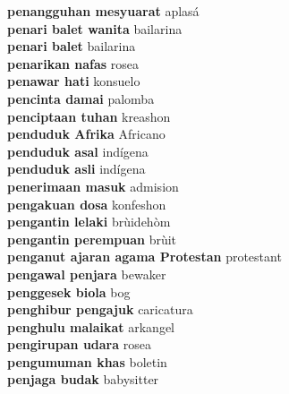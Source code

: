 \textbf{ penangguhan mesyuarat  } aplasá \\
\textbf{ penari balet wanita  } bailarina \\
\textbf{ penari balet  } bailarina \\
\textbf{ penarikan nafas  } rosea \\
\textbf{ penawar hati  } konsuelo \\
\textbf{ pencinta damai  } palomba \\
\textbf{ penciptaan tuhan  } kreashon \\
\textbf{ penduduk Afrika  } Africano \\
\textbf{ penduduk asal  } indígena \\
\textbf{ penduduk asli  } indígena \\
\textbf{ penerimaan masuk  } admision \\
\textbf{ pengakuan dosa  } konfeshon \\
\textbf{ pengantin lelaki  } brùidehòm \\
\textbf{ pengantin perempuan  } brùit \\
\textbf{ penganut ajaran agama Protestan  } protestant \\
\textbf{ pengawal penjara  } bewaker \\
\textbf{ penggesek biola  } bog \\
\textbf{ penghibur pengajuk  } caricatura \\
\textbf{ penghulu malaikat  } arkangel \\
\textbf{ pengirupan udara  } rosea \\
\textbf{ pengumuman khas  } boletin \\
\textbf{ penjaga budak  } babysitter \\
